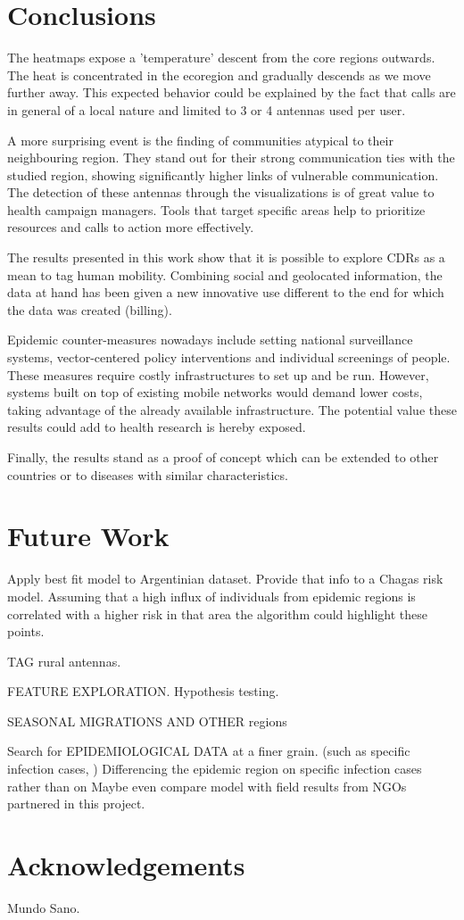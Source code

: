 \section{Conclusions}

The heatmaps expose a 'temperature' descent from the core regions outwards. The heat is concentrated in the ecoregion and gradually descends as we move further away. This expected behavior could be explained by the fact that calls are in general of a local nature and limited to 3 or 4 antennas used per user. 

A more surprising event is the finding of communities atypical to their neighbouring region. They stand out for their strong communication ties with the studied region, showing significantly higher links of vulnerable communication. The detection of these antennas through the visualizations is of great value to health campaign managers. Tools that target specific areas help to prioritize resources and calls to action more effectively.

The results presented in this work show that it is possible to explore CDRs as a mean to tag human mobility. Combining social and geolocated information, the data at hand has been given a new innovative use different to the end for which the data was created (billing).

Epidemic counter-measures nowadays include setting national surveillance systems, vector-centered policy interventions and individual screenings of people. These measures require costly infrastructures to set up and be run. However, systems built on top of existing mobile networks would demand lower costs, taking advantage of the already available infrastructure. The potential value these results could add to health research is hereby exposed.

Finally, the results stand as a proof of concept which can be extended to other countries or to diseases with similar characteristics.

\section{Future Work}
Apply best fit model to Argentinian dataset. Provide that info to a Chagas risk model. Assuming that a high influx of individuals from epidemic regions is correlated with a higher risk in that area the algorithm could highlight these points.

TAG rural antennas.

FEATURE EXPLORATION. Hypothesis testing. 

SEASONAL MIGRATIONS AND OTHER regions

Search for EPIDEMIOLOGICAL DATA at a finer grain. (such as specific infection cases, ) Differencing the epidemic region on specific infection cases rather than on
Maybe even compare model with field results from NGOs partnered in this project.

\section{Acknowledgements}
Mundo Sano.
